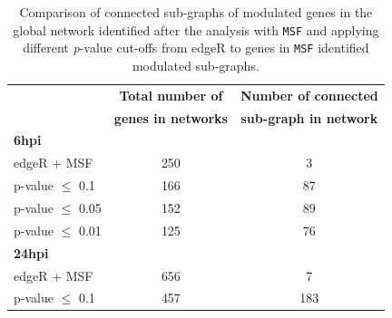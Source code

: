 \documentclass[10pt,a4paper,twocolumn]{article}
\begin{document}
	\begin{table}[]
		\centering
		\caption{Comparison of connected sub-graphs of
                  modulated genes in the global network identified
                  after the analysis with \texttt{MSF} and applying
                  different \textit{p}-value cut-offs from edgeR to
                  genes in \texttt{MSF} identified modulated sub-graphs. }
		\label{tab:rawVsHartung}
		\begin{tabular}{lll}
			\hline
			\multicolumn{1}{|l|}{}                            & \multicolumn{1}{c|}{\textbf{Total number of}}       & \multicolumn{1}{c|}{\textbf{Number of connected}}      \\
			\multicolumn{1}{|l|}{}                            & \multicolumn{1}{c|}{\textbf{genes in networks}}      & \multicolumn{1}{c|}{\textbf{sub-graph in network}}     \\ \hline
			\multicolumn{1}{|l|}{\textbf{6hpi}}               & \multicolumn{1}{l|}{}                                                & \multicolumn{1}{c|}{}                 \\ \hline
			\multicolumn{1}{|l|}{edgeR + MSF}                 & \multicolumn{1}{c|}{250}                                             & \multicolumn{1}{c|}{3}                \\ \hline
			\multicolumn{1}{|l|}{p-value $\leq$ 0.1}  & \multicolumn{1}{c|}{166}                                             & \multicolumn{1}{c|}{87}               \\ \hline
			\multicolumn{1}{|l|}{p-value $\leq$ 0.05} & \multicolumn{1}{c|}{152}                                             & \multicolumn{1}{c|}{89}               \\ \hline
			\multicolumn{1}{|l|}{p-value $\leq$ 0.01} & \multicolumn{1}{c|}{125}                                             & \multicolumn{1}{c|}{76}               \\ \hline
			\multicolumn{1}{|l|}{\textbf{24hpi}}              & \multicolumn{1}{c|}{}                                                & \multicolumn{1}{c|}{}                 \\ \hline
			\multicolumn{1}{|l|}{edgeR + MSF}                 & \multicolumn{1}{c|}{656}                                             & \multicolumn{1}{c|}{7}                \\ \hline
			\multicolumn{1}{|l|}{p-value $\leq$ 0.1}  & \multicolumn{1}{c|}{457}                                             & \multicolumn{1}{c|}{183}               \\ \hline

\end{tabular}
\end{table}
\end{document}
